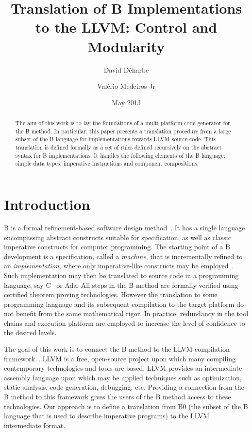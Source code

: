\documentclass{llncs}
\title{Translation of B Implementations to the LLVM: Control and Modularity}
\author{David Déharbe \and Valério Medeiros Jr}
\institute{Program of Graduate Studies in Systems and Computing (PPgSC) \\
  Federal University of Rio Grande do Norte \\
  Natal (Brazil)}
\date{May 2013}
\begin{document}
\maketitle

\begin{abstract}
  The aim of this work is to lay the foundations of a multi-platform code
  generator for the B method. In particular, this paper presents a translation
  procedure from a large subset of the B language for implementations towards
  LLVM source code. This translation is defined formally as a set of rules
  defined recursively on the abstract syntax for B implementations. It handles
  the following elements of the B language: simple data types, imperative
  instructions and component compositions. 
\end{abstract}

\section{Introduction}

B is a formal refinement-based software design method~\cite{Abrial1996}. It has
a single language encompassing abstract constructs suitable for specification,
as well as classic imperative constructs for computer programming. The starting
point of a B development is a specification, called a \emph{machine}, that is
incrementally refined to an \emph{implementation}, where only imperative-like
constructs may be employed~\cite{Clearsy}. Such implementation may then be
translated to source code in a programming language, say C~\cite{ComenC} or
Ada. All steps in the B method are formally verified using certified theorem
proving technologies. However the translation to some programming language and
its subsequent compilation to the target platform do not benefit from the same
mathematical rigor. In practice, redundancy in the tool chains and execution
platform are employed to increase the level of confidence to the desired levels.

The goal of this work is to connect the B method to the LLVM compilation
framework~\cite{Lattner04LLVM}.  LLVM is a free, open-source project upon which
many compiling contemporary technologies and tools are based. LLVM provides an
intermediate assembly language upon which may be applied techniques such as
optimization, static analysis, code generation, debugging, etc. Providing a
connection from the B method to this framework gives the users of the B method
access to these technologies. Our approach is to define a translation from B0
(the subset of the B language that is used to describe imperative programs) to
the LLVM intermediate format.
\end{document}
